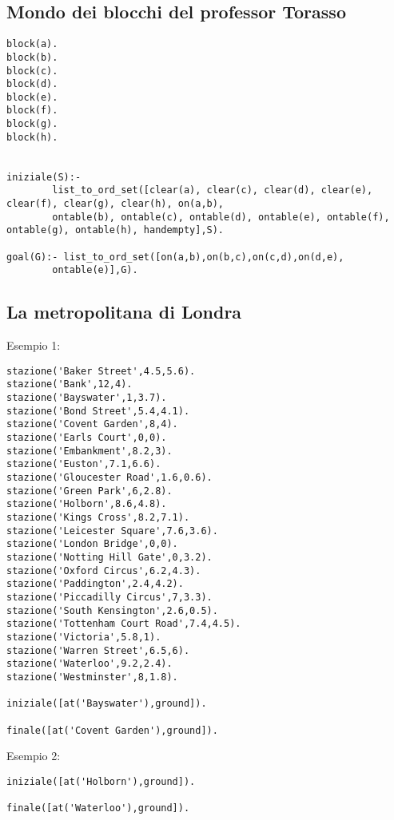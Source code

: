 \subsection{Mondo dei blocchi del professor Torasso}

\begin{lstlisting}
block(a).
block(b).
block(c).
block(d).
block(e).
block(f).
block(g).
block(h).


iniziale(S):-
        list_to_ord_set([clear(a), clear(c), clear(d), clear(e), clear(f), clear(g), clear(h), on(a,b),
        ontable(b), ontable(c), ontable(d), ontable(e), ontable(f), ontable(g), ontable(h), handempty],S).

goal(G):- list_to_ord_set([on(a,b),on(b,c),on(c,d),on(d,e),
        ontable(e)],G).
\end{lstlisting}

\subsection{La metropolitana di Londra}

Esempio 1:

\begin{lstlisting}
stazione('Baker Street',4.5,5.6).
stazione('Bank',12,4).
stazione('Bayswater',1,3.7).
stazione('Bond Street',5.4,4.1).
stazione('Covent Garden',8,4).
stazione('Earls Court',0,0).
stazione('Embankment',8.2,3).
stazione('Euston',7.1,6.6).
stazione('Gloucester Road',1.6,0.6).
stazione('Green Park',6,2.8).
stazione('Holborn',8.6,4.8).
stazione('Kings Cross',8.2,7.1).
stazione('Leicester Square',7.6,3.6).
stazione('London Bridge',0,0).
stazione('Notting Hill Gate',0,3.2).
stazione('Oxford Circus',6.2,4.3).
stazione('Paddington',2.4,4.2).
stazione('Piccadilly Circus',7,3.3).
stazione('South Kensington',2.6,0.5).
stazione('Tottenham Court Road',7.4,4.5).
stazione('Victoria',5.8,1).
stazione('Warren Street',6.5,6).
stazione('Waterloo',9.2,2.4).
stazione('Westminster',8,1.8).

iniziale([at('Bayswater'),ground]).

finale([at('Covent Garden'),ground]).
\end{lstlisting}

Esempio 2:

\begin{lstlisting}
iniziale([at('Holborn'),ground]).

finale([at('Waterloo'),ground]).
\end{lstlisting}

